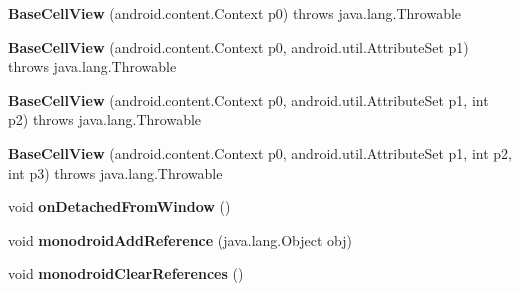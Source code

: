 \begin{DoxyCompactItemize}
\item 
\mbox{\label{classmd5b60ffeb829f638581ab2bb9b1a7f4f3f_1_1_base_cell_view_a7bbdf44f1151ae9c2fbf5be34398aba5}} 
{\bfseries Base\+Cell\+View} (android.\+content.\+Context p0)  throws java.\+lang.\+Throwable 	
\item 
\mbox{\label{classmd5b60ffeb829f638581ab2bb9b1a7f4f3f_1_1_base_cell_view_a8c64775ade9cdc20316e9b64a710eb0f}} 
{\bfseries Base\+Cell\+View} (android.\+content.\+Context p0, android.\+util.\+Attribute\+Set p1)  throws java.\+lang.\+Throwable 	
\item 
\mbox{\label{classmd5b60ffeb829f638581ab2bb9b1a7f4f3f_1_1_base_cell_view_afad241accb4e748807ae00d69c3fc2c3}} 
{\bfseries Base\+Cell\+View} (android.\+content.\+Context p0, android.\+util.\+Attribute\+Set p1, int p2)  throws java.\+lang.\+Throwable 	
\item 
\mbox{\label{classmd5b60ffeb829f638581ab2bb9b1a7f4f3f_1_1_base_cell_view_a0b1897543fcf568d3917ac5b35f7806b}} 
{\bfseries Base\+Cell\+View} (android.\+content.\+Context p0, android.\+util.\+Attribute\+Set p1, int p2, int p3)  throws java.\+lang.\+Throwable 	
\item 
\mbox{\label{classmd5b60ffeb829f638581ab2bb9b1a7f4f3f_1_1_base_cell_view_a4b8d6b90d0ba071c6af2db72188ea6ea}} 
void {\bfseries on\+Detached\+From\+Window} ()
\item 
\mbox{\label{classmd5b60ffeb829f638581ab2bb9b1a7f4f3f_1_1_base_cell_view_a7064411ae8713f07abf9855828ab5d7a}} 
void {\bfseries monodroid\+Add\+Reference} (java.\+lang.\+Object obj)
\item 
\mbox{\label{classmd5b60ffeb829f638581ab2bb9b1a7f4f3f_1_1_base_cell_view_abd00d7bfaf56776cb2df98366ee775d7}} 
void {\bfseries monodroid\+Clear\+References} ()
\end{DoxyCompactItemize}

